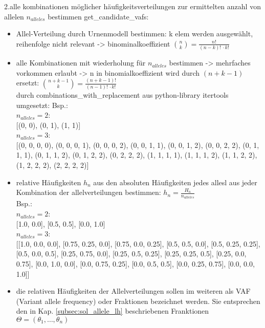 \noindent 2.alle kombinationen möglicher häufigkeitsverteilungen zur ermittelten anzahl von allelen $ n_{alleles} $ bestimmen get\_candidate\_vafs:\\
\begin{itemize}
	\item Allel-Verteilung durch Urnenmodell bestimmen: k elem werden ausgewählt, reihenfolge nicht relevant -> binominalkoeffizient $\binom{n}{k} = \frac{n!}{(n-k)!\, \cdotp k!}$ \\
	\item alle Kombinationen mit wiederholung für $n_{alleles} $ bestimmen -> mehrfaches vorkommen erlaubt -> n in binomialkoeffizient wird durch $(n + k -1)$ ersetzt: $\binom{n + k - 1}{k} = \frac{(n+k-1)!}{(n-1)!\, \cdotp k!}$\\ 
	durch combinations\_with\_replacement  aus python-library itertools umgesetzt:
	Bsp.: \\	
	$ n_{alleles} = 2$: \\
	{[(0, 0), (0, 1), (1, 1)]}\\
	$ n_{alleles} = 3$: \\
	{[(0, 0, 0, 0), (0, 0, 0, 1), (0, 0, 0, 2), (0, 0, 1, 1), (0, 0, 1, 2), (0, 0, 2, 2), (0, 1, 1, 1), (0, 1, 1, 2), (0, 1, 2, 2), (0, 2, 2, 2), (1, 1, 1, 1), (1, 1, 1, 2), (1, 1, 2, 2), (1, 2, 2, 2), (2, 2, 2, 2)]}\\
		
	\item relative Häufigkeiten $ h_{n} $  aus den absoluten Häufigkeiten jedes allesl aus jeder Kombination der allelverteilungen bestimmen:  $ h_{n} = \frac{H_{n}} {n_{alleles}} $\\
	Bsp.: \\
	$ n_{alleles} = 2$: \\
	{[1.0, 0.0]}, {[0.5, 0.5]}, {[0.0, 1.0]} \\
	$ n_{alleles} = 3$: \\
	{[{[1.0, 0.0, 0.0]}, {[0.75, 0.25, 0.0]}, {[0.75, 0.0, 0.25]}, {[0.5, 0.5, 0.0]}, {[0.5, 0.25, 0.25]}, {[0.5, 0.0, 0.5]},
		{[0.25, 0.75, 0.0]}, {[0.25, 0.5, 0.25]}, {[0.25, 0.25, 0.5]}, {[0.25, 0.0, 0.75]}, {[0.0, 1.0, 0.0]}, {[0.0, 0.75, 0.25]}, {[0.0, 0.5, 0.5]}, {[0.0, 0.25, 0.75]}, {[0.0, 0.0, 1.0]}]} \\
	\item die relativen Häufigkeiten der Allelverteilungen sollen im weiteren als VAF (Variant allele frequency) oder Fraktionen bezeichnet werden. Sie entsprechen den in Kap. \ref{subsec:sol_allele_lh} beschriebenen Franktionen $ \Theta = (\theta_{1}, \dots , \theta_{n}) $\\
\end{itemize}

